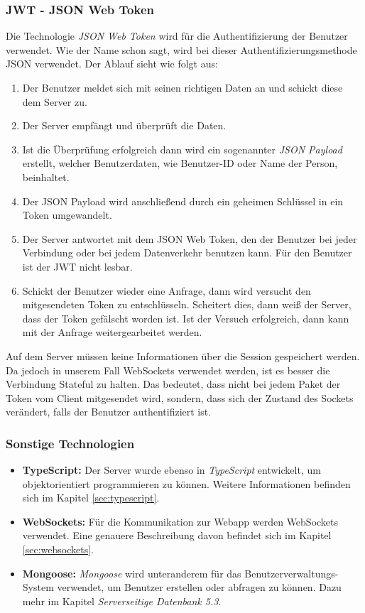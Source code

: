 \subsubsection{JWT - JSON Web Token}
Die Technologie \textit{JSON Web Token} wird für die Authentifizierung der Benutzer verwendet. Wie der Name schon sagt, wird bei dieser Authentifizierungsmethode JSON verwendet. \cite{jwt} Der Ablauf sieht wie folgt aus:
\begin{enumerate}
    \item Der Benutzer meldet sich mit seinen richtigen Daten an und schickt diese dem Server zu.
    \item Der Server empfängt und überprüft die Daten.
    \item Ist die Überprüfung erfolgreich dann wird ein sogenannter \textit{JSON Payload} erstellt, welcher Benutzerdaten, wie Benutzer-ID oder Name der Person, beinhaltet.
    \item Der JSON Payload wird anschließend durch ein geheimen Schlüssel in ein Token umgewandelt.
    \item Der Server antwortet mit dem JSON Web Token, den der Benutzer bei jeder Verbindung oder bei jedem Datenverkehr benutzen kann. Für den Benutzer ist der JWT nicht lesbar.
    \item Schickt der Benutzer wieder eine Anfrage, dann wird versucht den mitgesendeten Token zu entschlüsseln. Scheitert dies, dann weiß der Server, dass der Token gefälscht worden ist. Ist der Versuch erfolgreich, dann kann mit der Anfrage weitergearbeitet werden.
\end{enumerate}

Auf dem Server müssen keine Informationen über die Session gespeichert werden. Da jedoch in unserem Fall WebSockets verwendet werden, ist es besser die Verbindung Stateful zu halten. Das bedeutet, dass nicht bei jedem Paket der Token vom Client mitgesendet wird, sondern, dass sich der Zustand des Sockets verändert, falls der Benutzer authentifiziert ist.
\subsubsection{Sonstige Technologien}
\begin{itemize}
    \item \textbf{TypeScript:} Der Server wurde ebenso in \textit{TypeScript} entwickelt, um objektorientiert programmieren zu können. Weitere Informationen befinden sich im Kapitel \ref{sec:typescript}.
    \item \textbf{WebSockets:} Für die Kommunikation zur Webapp werden WebSockets verwendet. Eine genauere Beschreibung davon befindet sich im Kapitel \ref{sec:websockets}.
    \item \textbf{Mongoose:} \textit{Mongoose} wird unteranderem für das Benutzerverwaltungs-System verwendet, um Benutzer erstellen oder abfragen zu können. Dazu mehr im Kapitel \textit{Serverseitige Datenbank 5.3}.
\end{itemize}
\clearpage
